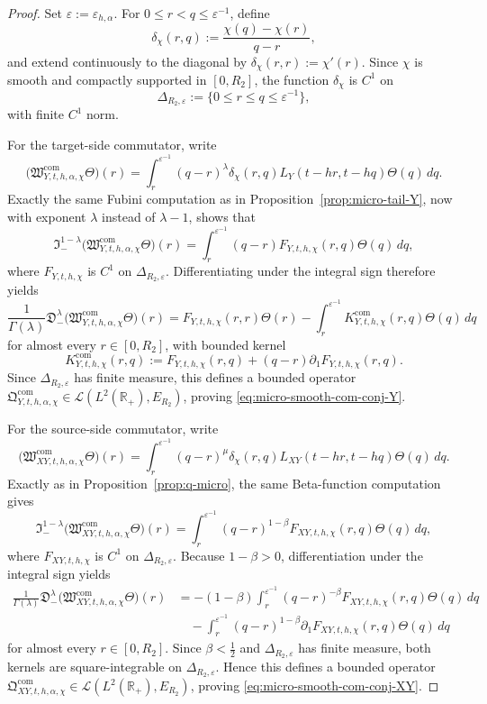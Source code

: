 \documentclass[11pt,a4paper]{amsart}
\theoremstyle{plain}
\theoremstyle{definition}
\theoremstyle{remark}
\newcommand{\R}{\mathbb{R}}
\begin{document}
\begin{proof}
Set \(\varepsilon:=\varepsilon_{h,\alpha}\). For \(0\le r<q\le \varepsilon^{-1}\), define
\[
\delta_\chi(r,q):=\frac{\chi(q)-\chi(r)}{q-r},
\]
and extend continuously to the diagonal by \(\delta_\chi(r,r):=\chi'(r)\). Since \(\chi\) is
smooth and compactly supported in \([0,R_2]\), the function \(\delta_\chi\) is \(C^1\) on
\[
\Delta_{R_2,\varepsilon}:=\{0\le r\le q\le \varepsilon^{-1}\},
\]
with finite \(C^1\) norm.

For the target-side commutator, write
\[
\bigl(
\mathfrak W_{Y,t,h,\alpha,\chi}^{\mathrm{com}}\Theta
\bigr)(r)
=
\int_r^{\varepsilon^{-1}}
(q-r)^\lambda
\delta_\chi(r,q)L_Y(t-hr,t-hq)\Theta(q)\,dq.
\]
Exactly the same Fubini computation as in Proposition~\ref{prop:micro-tail-Y}, now with exponent
\(\lambda\) instead of \(\lambda-1\), shows that
\[
\mathfrak I_-^{1-\lambda}
\bigl(
\mathfrak W_{Y,t,h,\alpha,\chi}^{\mathrm{com}}\Theta
\bigr)(r)
=
\int_r^{\varepsilon^{-1}}
(q-r)F_{Y,t,h,\chi}(r,q)\Theta(q)\,dq,
\]
where \(F_{Y,t,h,\chi}\) is \(C^1\) on \(\Delta_{R_2,\varepsilon}\). Differentiating under the
integral sign therefore yields
\[
\frac{1}{\Gamma(\lambda)}
\mathfrak D_-^\lambda
\bigl(
\mathfrak W_{Y,t,h,\alpha,\chi}^{\mathrm{com}}\Theta
\bigr)(r)
=
F_{Y,t,h,\chi}(r,r)\Theta(r)
-
\int_r^{\varepsilon^{-1}}
K_{Y,t,h,\chi}^{\mathrm{com}}(r,q)\Theta(q)\,dq
\]
for almost every \(r\in[0,R_2]\), with bounded kernel
\[
K_{Y,t,h,\chi}^{\mathrm{com}}(r,q)
:=
F_{Y,t,h,\chi}(r,q)
+
(q-r)\partial_1F_{Y,t,h,\chi}(r,q).
\]
Since \(\Delta_{R_2,\varepsilon}\) has finite measure, this defines a bounded operator
\(\mathfrak Q_{Y,t,h,\alpha,\chi}^{\mathrm{com}}\in\mathcal L(L^2(\R_+),E_{R_2})\), proving
\eqref{eq:micro-smooth-com-conj-Y}.

For the source-side commutator, write
\[
\bigl(
\mathfrak W_{XY,t,h,\alpha,\chi}^{\mathrm{com}}\Theta
\bigr)(r)
=
\int_r^{\varepsilon^{-1}}
(q-r)^\mu
\delta_\chi(r,q)L_{XY}(t-hr,t-hq)\Theta(q)\,dq.
\]
Exactly as in Proposition~\ref{prop:q-micro}, the same Beta-function computation gives
\[
\mathfrak I_-^{1-\lambda}
\bigl(
\mathfrak W_{XY,t,h,\alpha,\chi}^{\mathrm{com}}\Theta
\bigr)(r)
=
\int_r^{\varepsilon^{-1}}
(q-r)^{1-\beta}
F_{XY,t,h,\chi}(r,q)\Theta(q)\,dq,
\]
where \(F_{XY,t,h,\chi}\) is \(C^1\) on \(\Delta_{R_2,\varepsilon}\). Because \(1-\beta>0\),
differentiation under the integral sign yields
\begin{align*}
\frac{1}{\Gamma(\lambda)}
\mathfrak D_-^\lambda
\bigl(
\mathfrak W_{XY,t,h,\alpha,\chi}^{\mathrm{com}}\Theta
\bigr)(r)
&=
-(1-\beta)
\int_r^{\varepsilon^{-1}}
(q-r)^{-\beta}
F_{XY,t,h,\chi}(r,q)\Theta(q)\,dq\\
&\quad-
\int_r^{\varepsilon^{-1}}
(q-r)^{1-\beta}
\partial_1F_{XY,t,h,\chi}(r,q)\Theta(q)\,dq
\end{align*}
for almost every \(r\in[0,R_2]\). Since \(\beta<\tfrac12\) and
\(\Delta_{R_2,\varepsilon}\) has finite measure, both kernels are square-integrable on
\(\Delta_{R_2,\varepsilon}\). Hence this defines a bounded operator
\(\mathfrak Q_{XY,t,h,\alpha,\chi}^{\mathrm{com}}\in\mathcal L(L^2(\R_+),E_{R_2})\), proving
\eqref{eq:micro-smooth-com-conj-XY}.
\end{proof}
\end{document}

